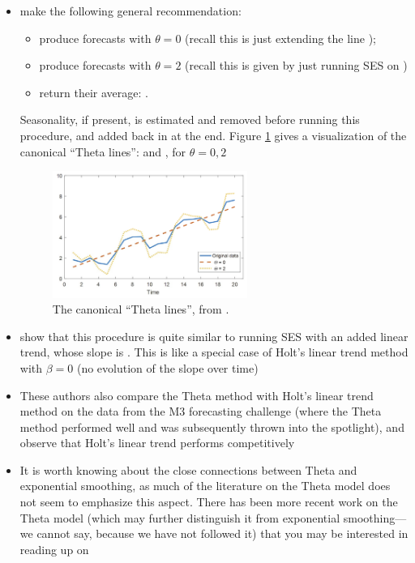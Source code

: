 \documentclass{article}
\begin{document}
\begin{itemize}
\item \citet{assimakopoulos2000theta} make the following general recommendation:
  \begin{itemize}
  \item produce forecasts  with $\theta = 0$ (recall 
    this is just extending the line );
  \item produce forecasts  with $\theta = 2$ (recall 
    this is given by just running SES on ) 
  \item return their average: . 
  \end{itemize}
  Seasonality, if present, is estimated and removed before running this
  procedure, and added back in at the end. Figure \ref{fig:theta} gives a
  visualization of the canonical ``Theta lines'':  and 
  , for $\theta = 0,2$

\begin{figure}[htb]
\centering
\includegraphics[width=0.6\textwidth]{theta.png}
\caption{The canonical ``Theta lines'', from \citet{dudek2019short}.}      
\label{fig:theta}
\end{figure}

\item \citet{hyndman2003unmasking} show that this procedure is quite similar to
  running SES with an added linear trend, whose slope is . This is like a special case of Holt's linear trend method with $\beta =
  0$ (no evolution of the slope over time)   

\item These authors also compare the Theta method with Holt's linear trend
  method on the data from the M3 forecasting challenge (where the Theta method
  performed well and was subsequently thrown into the spotlight), and observe
  that Holt's linear trend performs competitively  

\item It is worth knowing about the close connections between Theta and
  exponential smoothing, as much of the literature on the Theta model does not
  seem to emphasize this aspect. There has been more recent work on the Theta
  model (which may further distinguish it from exponential smoothing---we cannot
  say, because we have not followed it) that you may be interested in reading up
  on    
\end{itemize}
\end{document}
